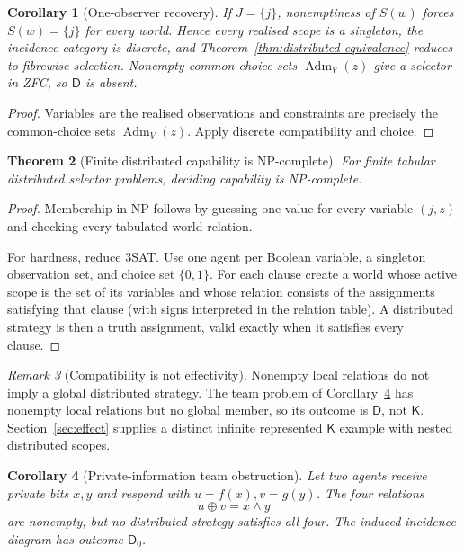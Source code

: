 \documentclass[11pt]{article}
\theoremstyle{plain}
\newtheorem{theorem}{Theorem}[section]
\newtheorem{corollary}[theorem]{Corollary}
\theoremstyle{definition}
\theoremstyle{remark}
\newtheorem{remark}[theorem]{Remark}
\newcommand{\Adm}{\operatorname{Adm}}
\begin{document}
\begin{corollary}[One-observer recovery]\label{cor:distributed-one}
If $J=\{j\}$, nonemptiness of $S(w)$ forces $S(w)=\{j\}$ for every world.
Hence every realised scope is a singleton, the incidence category is discrete,
and Theorem~\ref{thm:distributed-equivalence} reduces to fibrewise selection. Nonempty common-choice sets $\Adm_V(z)$ give a selector in ZFC, so $\mathsf D$ is absent.
\end{corollary}

\begin{proof}
Variables are the realised observations and constraints are precisely the
common-choice sets $\Adm_V(z)$. Apply discrete compatibility and choice.
\end{proof}

\begin{theorem}[Finite distributed capability is NP-complete]
\label{thm:distributed-NP}
For finite tabular distributed selector problems, deciding capability is
NP-complete.
\end{theorem}

\begin{proof}
Membership in NP follows by guessing one value for every variable $(j,z)$ and
checking every tabulated world relation.

For hardness, reduce 3SAT. Use one agent per Boolean variable, a singleton
observation set, and choice set $\{0,1\}$. For each clause create a world whose
active scope is the set of its variables and whose relation consists of the
assignments satisfying that clause (with signs interpreted in the
relation table). A distributed strategy is then a truth assignment, valid
exactly when it satisfies every clause.
\end{proof}

\begin{remark}[Compatibility is not effectivity]
Nonempty local relations do not imply a global distributed strategy. The team
problem of Corollary~\ref{cor:team-decision} has nonempty local relations but no
global member, so its outcome is $\mathsf D$, not $\mathsf K$.
Section~\ref{sec:effect} supplies a distinct infinite represented
$\mathsf K$ example with nested distributed scopes.
\end{remark}



\begin{corollary}[Private-information team obstruction]
\label{cor:team-decision}
Let two agents receive private bits $x,y$ and respond with
$u=f(x),v=g(y)$. The four relations
\[
u\oplus v=x\wedge y
\]
are nonempty, but no distributed strategy satisfies all four. The induced
incidence diagram has outcome $\mathsf D_0$.
\end{corollary}
\end{document}
